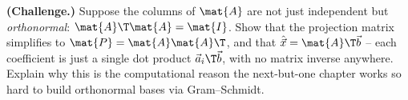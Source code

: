 \begin{exercise}\label{ch18:ex-orthonormal}
\textbf{(Challenge.)} Suppose the columns of $\mat{A}$ are not just independent but
\emph{orthonormal}: $\mat{A}\T\mat{A}=\mat{I}$. Show that the projection matrix simplifies to
$\mat{P}=\mat{A}\mat{A}\T$, and that $\hat{\vec{x}}=\mat{A}\T\vec{b}$ -- each coefficient is just a
single dot product $\vec{a}_i\T\vec{b}$, with no matrix inverse anywhere. Explain why this is the
computational reason the next-but-one chapter works so hard to build orthonormal bases via
Gram--Schmidt.
\end{exercise}
